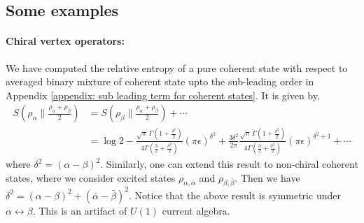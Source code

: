 \documentclass[11pt]{article}
\newcommand{\ep}{\epsilon}
\newcommand{\p}{\partial}
\newcommand{\nn}{\nonumber}
\newcommand{\lb}{\left(}
\newcommand{\rb}{\right)}
\newcommand{\JM}[1]{\textcolor{orange}{#1}}
\begin{document}

\subsection{Some examples}
\paragraph{Chiral vertex operators:} We have computed the relative entropy of a pure coherent state with respect to averaged binary mixture of coherent state upto the sub-leading order in Appendix \ref{appendix: sub leading term for coherent states}. It is given by,
\begin{align}
    S\lb
    \rho_\alpha
    \Big\|
    \frac{\rho_\alpha+\rho_\beta}{2}
    \rb
    &= S\lb
    \rho_\beta
    \Big\|
    \frac{\rho_\alpha+\rho_\beta}{2}
    \rb +\cdots \\&= 
    \log 2
    -
    \frac{
    \sqrt{\pi}\,
    \Gamma\lb1+\frac{\delta^2}{2}\rb
    }{
    4\Gamma\lb\frac32+\frac{\delta^2}{2}\rb
    }
    (\pi\ep)^{\delta^2}+
    \frac{3\delta^2}{2\pi}
    \frac{
    \sqrt{\pi}\,
    \Gamma\lb1+\frac{\delta^2}{2}\rb
    }{
    4\Gamma\lb\frac32+\frac{\delta^2}{2}\rb
    }
    (\pi\ep)^{\delta^2+1}
    +\cdots 
\end{align}
where $\delta^2 = (\alpha - \beta)^2$. Similarly, one can extend this result to non-chiral coherent states, where we consider excited states $\rho_{\alpha,\bar \alpha}$ and $\rho_{\beta,\bar\beta}$. Then we have $\delta^2 = (\alpha - \beta)^2 + (\bar \alpha - \bar \beta)^2$. Notice that the above result is symmetric under $\alpha \leftrightarrow \beta$. This is an artifact of $U(1)$ current algebra.
\end{document}
